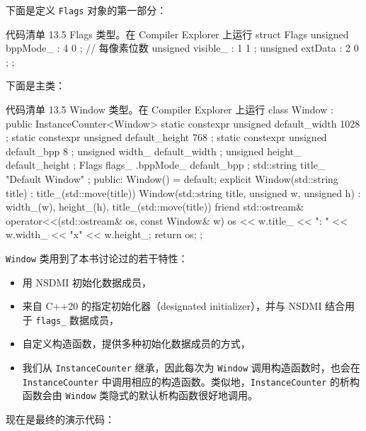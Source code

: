 下面是定义 \texttt{Flags} 对象的第一部分：


\begin{codeboxt}[cpp]{代码清单 13.5 Flags 类型。在 Compiler Explorer 上运行}
struct Flags {
unsigned bppMode_ : 4 { 0 }; // 每像素位数
unsigned visible_ : 1 { 1 };
unsigned extData
: 2 { 0 };
};
\end{codeboxt}

下面是主类：

\begin{codeboxt}[cpp]{代码清单 13.5 Window 类型。在 Compiler Explorer 上运行}
class Window : public InstanceCounter<Window> {
static constexpr unsigned default_width { 1028 };
static constexpr unsigned default_height { 768 };
static constexpr unsigned default_bpp { 8 };
unsigned width_ { default_width };
unsigned height_ { default_height };
Flags flags_ {.bppMode_ { default_bpp } };
std::string title_ { "Default Window" };
public:
Window() = default;
explicit Window(std::string title) : title_(std::move(title)) { }
Window(std::string title, unsigned w, unsigned h) :
width_(w), height_(h), title_(std::move(title)) {}
friend std::ostream& operator<<(std::ostream& os, const Window& w) {
os << w.title_ << ": " << w.width_ << "x" << w.height_;
return os;
}
};
\end{codeboxt}

\texttt{Window} 类用到了本书讨论过的若干特性：

\begin{itemize}
\item 用 NSDMI 初始化数据成员，
\item 来自 C++20 的指定初始化器（designated initializer），并与 NSDMI 结合用于 \texttt{flags\_} 数据成员，
\item 自定义构造函数，提供多种初始化数据成员的方式，
\item 我们从 \texttt{InstanceCounter} 继承，因此每次为 \texttt{Window} 调用构造函数时，也会在 \texttt{InstanceCounter} 中调用相应的构造函数。类似地，\texttt{InstanceCounter} 的析构函数会由 \texttt{Window} 类隐式的默认析构函数很好地调用。
\end{itemize}

现在是最终的演示代码：

